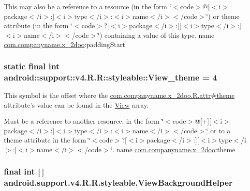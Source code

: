 This may also be a reference to a resource (in the form \char`\"{}$<$code$>$@\mbox{[}$<$i$>$package$<$/i$>$:\mbox{]}$<$i$>$type$<$/i$>$:$<$i$>$name$<$/i$>$$<$/code$>$\char`\"{}) or theme attribute (in the form \char`\"{}$<$code$>$?\mbox{[}$<$i$>$package$<$/i$>$:\mbox{]}\mbox{[}$<$i$>$type$<$/i$>$:\mbox{]}$<$i$>$name$<$/i$>$$<$/code$>$\char`\"{}) containing a value of this type.  name \hyperlink{namespacecom_1_1companyname_1_1x__2doo}{com.companyname.x\_\-2doo}:paddingStart \hypertarget{classandroid_1_1support_1_1v4_1_1_r_1_1styleable_476575738874837ba5b44a1c9cedb790}{
\subsubsection[{View\_\-theme}]{\setlength{\rightskip}{0pt plus 5cm}static final int android::support::v4.R.R::styleable::View\_\-theme = 4}}
\label{classandroid_1_1support_1_1v4_1_1_r_1_1styleable_476575738874837ba5b44a1c9cedb790}


This symbol is the offset where the \hyperlink{classcom_1_1companyname_1_1x__2doo_1_1_r_1_1attr_4a2ef07a359ea32f3e0192bc0bcb189e}{com.companyname.x\_\-2doo.R.attr\#theme} attribute's value can be found in the \hyperlink{classandroid_1_1support_1_1v4_1_1_r_1_1styleable_b4963d78f1fa8984188692ee48ea20d2}{View} array.

Must be a reference to another resource, in the form \char`\"{}$<$code$>$@\mbox{[}+\mbox{]}\mbox{[}$<$i$>$package$<$/i$>$:\mbox{]}$<$i$>$type$<$/i$>$:$<$i$>$name$<$/i$>$$<$/code$>$\char`\"{} or to a theme attribute in the form \char`\"{}$<$code$>$?\mbox{[}$<$i$>$package$<$/i$>$:\mbox{]}\mbox{[}$<$i$>$type$<$/i$>$:\mbox{]}$<$i$>$name$<$/i$>$$<$/code$>$\char`\"{}.  name \hyperlink{namespacecom_1_1companyname_1_1x__2doo}{com.companyname.x\_\-2doo}:theme \hypertarget{classandroid_1_1support_1_1v4_1_1_r_1_1styleable_d2471e02511d7025f7168272065a760a}{
\subsubsection[{ViewBackgroundHelper}]{\setlength{\rightskip}{0pt plus 5cm}final int \mbox{[}$\,$\mbox{]} android.support.v4.R.R.styleable.ViewBackgroundHelper}}
\label{classandroid_1_1support_1_1v4_1_1_r_1_1styleable_d2471e02511d7025f7168272065a760a}


